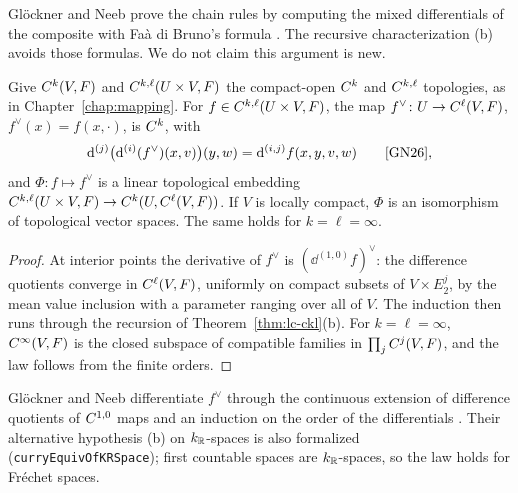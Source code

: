 \begin{remark}
  Glöckner and Neeb prove the chain rules by computing the mixed differentials of the composite
  with Faà di Bruno's formula \cite[(1.91)--(1.97)]{GN26}. The recursive characterization (b)
  avoids those formulas. We do not claim this argument is new.
\end{remark}

\begin{theorem}
  \label{thm:lc-exponential-law}
  \leanok
  Give $C^{k}(V, F)$ and $C^{k,\ell}(U \times V, F)$ the compact-open $C^{k}$ and $C^{k,\ell}$
  topologies, as in Chapter~\ref{chap:mapping}. For $f \in C^{k,\ell}(U \times V, F)$, the map
  $f^\vee \colon U \to C^{\ell}(V, F)$, $f^\vee(x) = f(x, \cdot)$, is $C^{k}$, with
  \[
    \dd^{(j)}\bigl(\dd^{(i)}(f^\vee)(x, v)\bigr)(y, w) = \dd^{(i,j)} f(x, y, v, w)
    \qquad \text{\cite[(1.98)]{GN26}},
  \]
  and $\Phi \colon f \mapsto f^\vee$ is a linear topological embedding
  $C^{k,\ell}(U \times V, F) \to C^{k}(U, C^{\ell}(V, F))$. If $V$ is locally compact, $\Phi$ is
  an isomorphism of topological vector spaces. The same holds for $k = \ell = \infty$.
\end{theorem}

\begin{proof}
  \leanok
  At interior points the derivative of $f^\vee$ is $(\dd^{(1,0)} f)^\vee$: the difference
  quotients converge in $C^{\ell}(V, F)$, uniformly on compact subsets of $V \times E_2^j$, by
  the mean value inclusion with a parameter ranging over all of $V$. The induction then runs
  through the recursion of Theorem~\ref{thm:lc-ckl}(b). For $k = \ell = \infty$, $C^{\infty}(V, F)$
  is the closed subspace of compatible families in $\prod_j C^{j}(V, F)$, and the law follows from
  the finite orders.
\end{proof}

\begin{remark}
  Glöckner and Neeb differentiate $f^\vee$ through the continuous extension of difference
  quotients of $C^{1,0}$ maps \cite[Lemma~1.7.6]{GN26} and an induction on the order of the
  differentials \cite[(1.99)]{GN26}. Their alternative hypothesis (b) on $k_{\mathbb{R}}$-spaces is also
  formalized (\texttt{curryEquivOfKRSpace}); first countable spaces are $k_{\mathbb{R}}$-spaces, so the law
  holds for Fréchet spaces.
\end{remark}
